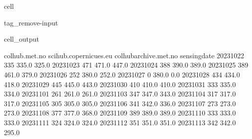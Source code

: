\documentclass[letterpaper,10pt,english]{jupyterBook}
\begin{document}
\begin{sphinxuseclass}{cell}
\begin{sphinxuseclass}{tag_remove-input}\begin{sphinxVerbatimOutput}

\begin{sphinxuseclass}{cell_output}
\begin{sphinxVerbatim}[commandchars=\\\{\}]
              colhub.met.no  scihub.copernicues.eu  colhub\PYGZhy{}archive.met.no  \PYGZbs{}
sensing\PYGZus{}date                                                                
2023\PYGZhy{}10\PYGZhy{}22              335                  335.0                  325.0   
2023\PYGZhy{}10\PYGZhy{}23              471                  471.0                  447.0   
2023\PYGZhy{}10\PYGZhy{}24              388                  390.0                  389.0   
2023\PYGZhy{}10\PYGZhy{}25              389                  461.0                  379.0   
2023\PYGZhy{}10\PYGZhy{}26              252                  380.0                  252.0   
2023\PYGZhy{}10\PYGZhy{}27                0                  380.0                    0.0   
2023\PYGZhy{}10\PYGZhy{}28              434                  434.0                  418.0   
2023\PYGZhy{}10\PYGZhy{}29              445                  445.0                  443.0   
2023\PYGZhy{}10\PYGZhy{}30              410                  410.0                  410.0   
2023\PYGZhy{}10\PYGZhy{}31              333                  335.0                  334.0   
2023\PYGZhy{}11\PYGZhy{}01              261                  261.0                  261.0   
2023\PYGZhy{}11\PYGZhy{}03              347                  347.0                  343.0   
2023\PYGZhy{}11\PYGZhy{}04              317                  317.0                  317.0   
2023\PYGZhy{}11\PYGZhy{}05              305                  305.0                  305.0   
2023\PYGZhy{}11\PYGZhy{}06              341                  342.0                  336.0   
2023\PYGZhy{}11\PYGZhy{}07              273                  273.0                  273.0   
2023\PYGZhy{}11\PYGZhy{}08              377                  377.0                  368.0   
2023\PYGZhy{}11\PYGZhy{}09              389                  389.0                  389.0   
2023\PYGZhy{}11\PYGZhy{}10              333                  333.0                  333.0   
2023\PYGZhy{}11\PYGZhy{}11              324                  324.0                  324.0   
2023\PYGZhy{}11\PYGZhy{}12              351                  351.0                  351.0   
2023\PYGZhy{}11\PYGZhy{}13              342                  342.0                  295.0   

\end{sphinxVerbatim}
\end{sphinxuseclass}
\end{sphinxVerbatimOutput}
\end{sphinxuseclass}
\end{sphinxuseclass}
\end{document}

